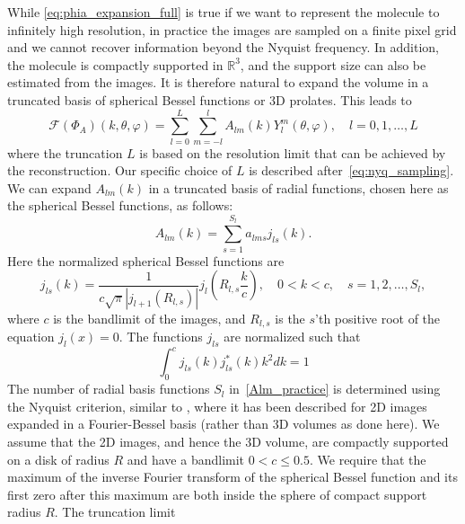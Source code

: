 While \eqref{eq:phia_expansion_full} is true if we 
want to represent the molecule to infinitely high resolution, in practice the 
images are sampled on a finite pixel grid and we cannot recover information beyond the Nyquist 
frequency. In addition, the molecule is compactly supported in $\mathbb{R}^3$, 
and the support size can also be estimated from the images. It is therefore 
natural to expand the volume in a truncated basis of spherical Bessel functions or 3D 
prolates. This leads to
\begin{equation}\label{eq:phia_expansion}
\mathcal{F}(\Phi_A)(k,\theta,\varphi) = \sum_{l=0}^{L} \sum_{m=-l}^{l} A_{lm}(k)
Y_l^m
(\theta, \varphi), \quad l=0, 1,\ldots, L 
\end{equation}
where the truncation $L$ is based on the resolution limit that can be achieved by the reconstruction. Our specific choice of $L$ is described after~\eqref{eq:nyq_sampling}. We can expand $A_{lm}(k)$ in a truncated basis of radial functions, chosen here as the spherical Bessel functions, as 
follows:
\begin{equation}
\label{Alm_practice}
A_{lm}(k)= \sum_{s=1}^{S_l} a _{lms}j_{ls}(k).
\end{equation}
Here the normalized spherical Bessel functions are
\begin{equation}
\label{j_ls}
j_{ls}(k)= \frac{1}{c\sqrt{\pi}|j_{l+1}(R_{l,s})|} j_l(R_{l,s}\frac{k}{c}), \quad 0<k<c, 
\quad s=1,2,\ldots,S_l,
\end{equation}
where $c$ is the bandlimit of the images, and $R_{l,s}$ is the $s$'th positive root of the equation $j_l(x)=0$. The functions
$j_{ls}$ are normalized such that
\begin{equation}
\int_0^c j_{ls}(k) j_{ls}^*(k) k^2 dk =1
\end{equation}
The number of radial basis functions $S_l$ in~\eqref{Alm_practice} is determined using the Nyquist criterion, similar to \cite{klug1972, Zhao2016}, where it has been described for 2D images expanded in a Fourier-Bessel basis (rather than 3D volumes as done here). We assume that the 2D images, and hence the 3D volume, are compactly supported on a disk of radius 
$R$ and have a bandlimit $0<c\leq0.5$. We require that the maximum of the inverse Fourier transform of the spherical Bessel function and its first zero after this maximum are both inside the sphere of compact support radius $R$. The truncation limit 
